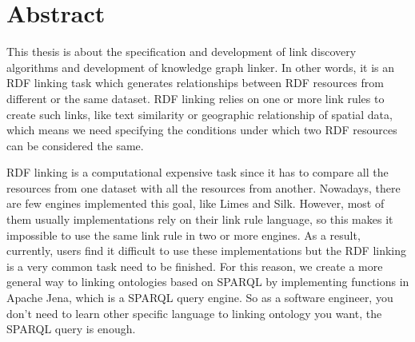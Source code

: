 
\newpage

\chapter*{Abstract}


This thesis is about the specification and development of link discovery algorithms and development of knowledge graph linker. In other words, it is an RDF linking task which generates relationships between RDF resources from different or the same dataset. RDF linking relies on one or more link rules to create such links, like text similarity or geographic relationship of spatial data, which means we need specifying the conditions under which two RDF resources can be considered the same. 


RDF linking is a computational expensive task since it has to compare all the resources from one dataset with all the resources from another. Nowadays, there are few engines implemented this goal, like Limes and Silk. However, most of them usually implementations rely on their link rule language, so this makes it impossible to use the same link rule in two or more engines. As a result, currently, users find it difficult to use these implementations but the RDF linking is a very common task need to be finished. For this reason, we create a more general way to linking ontologies based on SPARQL by implementing functions in Apache Jena, which is a SPARQL query engine. So as a software engineer, you don't need to learn other specific language to linking ontology you want, the SPARQL query is enough.



\hspace{10pt}
